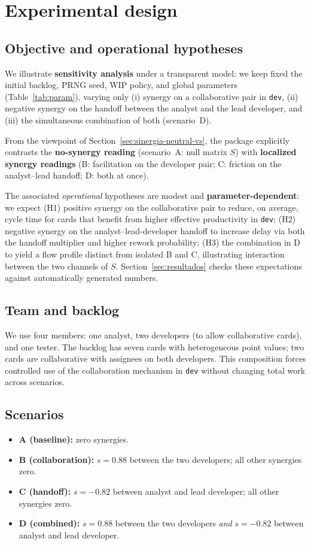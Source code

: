 \section{Experimental design}
\label{sec:experimentos}

\subsection{Objective and operational hypotheses}
We illustrate \textbf{sensitivity analysis} under a transparent model: we keep fixed the initial backlog, PRNG seed, WIP policy, and global parameters (Table~\ref{tab:param}), varying only (i) synergy on a collaborative pair in \texttt{dev}, (ii) negative synergy on the handoff between the analyst and the lead developer, and (iii) the simultaneous combination of both (scenario~D).

From the viewpoint of Section~\ref{sec:sinergia-neutral-vs}, the package explicitly contrasts the \textbf{no-synergy reading} (scenario~A: null matrix $S$) with \textbf{localized synergy readings} (B: facilitation on the developer pair; C: friction on the analyst--lead handoff; D: both at once).

The associated \emph{operational} hypotheses are modest and \textbf{parameter-dependent}: we expect (H1) positive synergy on the collaborative pair to reduce, on average, cycle time for cards that benefit from higher effective productivity in \texttt{dev}; (H2) negative synergy on the analyst--lead-developer handoff to increase delay via both the handoff multiplier and higher rework probability; (H3) the combination in D to yield a flow profile distinct from isolated B and C, illustrating interaction between the two channels of $S$. Section~\ref{sec:resultados} checks these expectations against automatically generated numbers.

\subsection{Team and backlog}
We use four members: one analyst, two developers (to allow collaborative cards), and one tester. The backlog has seven cards with heterogeneous point values; two cards are collaborative with assignees on both developers. This composition forces controlled use of the collaboration mechanism in \texttt{dev} without changing total work across scenarios.

\subsection{Scenarios}
\begin{itemize}
  \item \textbf{A (baseline):} zero synergies.
  \item \textbf{B (collaboration):} $s=0.88$ between the two developers; all other synergies zero.
  \item \textbf{C (handoff):} $s=-0.82$ between analyst and lead developer; all other synergies zero.
  \item \textbf{D (combined):} $s=0.88$ between the two developers \emph{and} $s=-0.82$ between analyst and lead developer.
\end{itemize}

